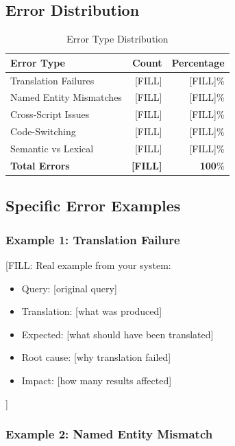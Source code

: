\documentclass[12pt,a4paper]{report}
\begin{document}
\subsection{Error Distribution}

\begin{table}[H]
    \centering
    \begin{tabular}{|l|r|r|}
        \hline
        \textbf{Error Type} & \textbf{Count} & \textbf{Percentage} \\
        \hline
        Translation Failures & [FILL] & [FILL]\% \\
        \hline
        Named Entity Mismatches & [FILL] & [FILL]\% \\
        \hline
        Cross-Script Issues & [FILL] & [FILL]\% \\
        \hline
        Code-Switching & [FILL] & [FILL]\% \\
        \hline
        Semantic vs Lexical & [FILL] & [FILL]\% \\
        \hline
        \textbf{Total Errors} & \textbf{[FILL]} & \textbf{100}\% \\
        \hline
    \end{tabular}
    \caption{Error Type Distribution}
\end{table}

\subsection{Specific Error Examples}

\subsubsection{Example 1: Translation Failure}

[FILL: Real example from your system:
\begin{itemize}
    \item Query: [original query]
    \item Translation: [what was produced]
    \item Expected: [what should have been translated]
    \item Root cause: [why translation failed]
    \item Impact: [how many results affected]
\end{itemize}
]

\subsubsection{Example 2: Named Entity Mismatch}
\end{document}
